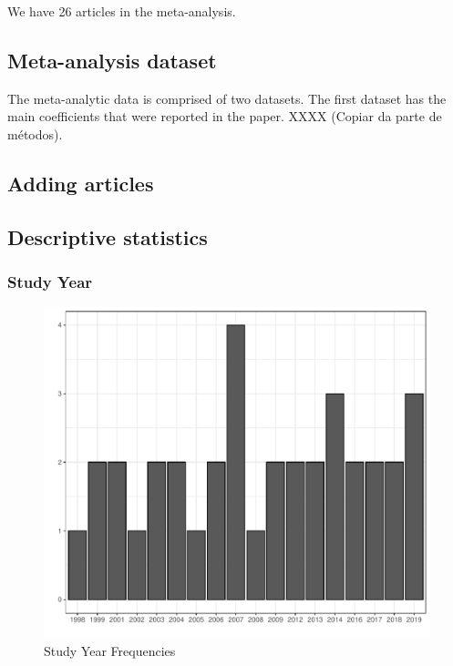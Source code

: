 \documentclass[
]{article}
\begin{document}
We have 26 articles in the meta-analysis.

\hypertarget{meta-analysis-dataset}{%
\subsection{Meta-analysis dataset}\label{meta-analysis-dataset}}

The meta-analytic data is comprised of two datasets. The first dataset
has the main coefficients that were reported in the paper. XXXX (Copiar
da parte de métodos).

\hypertarget{adding-articles}{%
\subsection{Adding articles}\label{adding-articles}}

\newpage

\hypertarget{descriptive-statistics}{%
\subsection{Descriptive statistics}\label{descriptive-statistics}}

\hypertarget{study-year}{%
\subsubsection{Study Year}\label{study-year}}

\begin{figure}
\centering
\includegraphics{appendixV5_files/figure-latex/unnamed-chunk-2-1.pdf}
\caption{Study Year Frequencies}
\end{figure}
\end{document}
